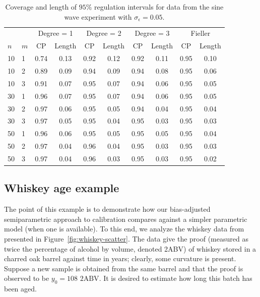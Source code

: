 \documentclass[cmfont,usenames,dvipsnames,leqno]{afit-etd}\usepackage[]{graphicx}\usepackage[]{color}
\begin{document}
\begin{table}[H]%
\centering
\caption[Semiparametric regulation Monte Carlo simulation]{Coverage and length of $95\%$ regulation intervals for data from the sine wave experiment with $\sigma_\epsilon = 0.05$. \label{tab:pspline-monte-carlo-2}}
  \begin{tabular}{llcccccccc}
  \toprule
  \phantom{abc} & \phantom{abc} & \multicolumn{2}{c}{Degree = 1} & \multicolumn{2}{c}{Degree = 2} & \multicolumn{2}{c}{Degree = 3} & \multicolumn{2}{c}{Fieller} \\
  \cline{3-10}
  $n$ & $m$ & CP & Length & CP & Length & CP & Length & CP & Length \\
  \hline
  10  &  1  & 0.74 & 0.13 & 0.92 & 0.12 & 0.92 & 0.11 & 0.95 & 0.10 \\
  10  &  2  & 0.89 & 0.09 & 0.94 & 0.09 & 0.94 & 0.08 & 0.95 & 0.06 \\
  10  &  3  & 0.91 & 0.07 & 0.95 & 0.07 & 0.94 & 0.06 & 0.95 & 0.05 \\
  \hline
  30  &  1  & 0.96 & 0.07 & 0.95 & 0.07 & 0.94 & 0.06 & 0.95 & 0.05 \\
  30  &  2  & 0.97 & 0.06 & 0.95 & 0.05 & 0.94 & 0.04 & 0.95 & 0.04 \\
  30  &  3  & 0.97 & 0.05 & 0.95 & 0.04 & 0.95 & 0.03 & 0.95 & 0.03 \\
  \hline
  50  &  1  & 0.96 & 0.06 & 0.95 & 0.05 & 0.95 & 0.05 & 0.95 & 0.04 \\
  50  &  2  & 0.97 & 0.04 & 0.96 & 0.04 & 0.95 & 0.03 & 0.95 & 0.03 \\
  50  &  3  & 0.97 & 0.04 & 0.96 & 0.03 & 0.95 & 0.03 & 0.95 & 0.02 \\
  \bottomrule
  \end{tabular}
\end{table}

\subsection{Whiskey age example}
\label{sec:whiskey}
The point of this example is to demonstrate how our bias-adjusted semiparametric approach to calibration compares against a simpler parametric model (when one is available). To this end, we analyze the whiskey data from \citet{schoeneman_analytical_1971} presented in Figure~\ref{fig:whiskey-scatter}. The data give the proof (measured as twice the percentage of alcohol by volume, denoted 2ABV) of whiskey stored in a charred oak barrel against time in years; clearly, some curvature is present. Suppose a new sample is obtained from the same barrel and that the proof is observed to be $y_0 = 108 \text{ 2ABV}$. It is desired to estimate how long this batch has been aged.
\end{document}
